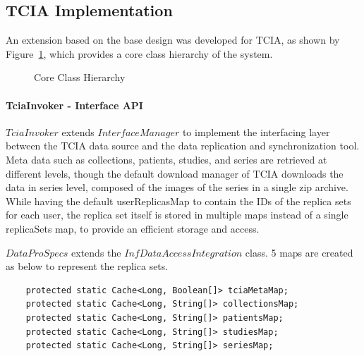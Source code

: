 \documentclass[conference]{IEEEtran}
\begin{document}
\subsection{TCIA Implementation}
An extension based on the base design was developed for TCIA, as shown by Figure~\ref{fig:class}, which provides a core class hierarchy of the system.
\begin{figure}[b]
\begin{center}
\end{center}
 \caption{Core Class Hierarchy}
 \label{fig:class}
\end{figure}

\paragraph*{TciaInvoker - Interface API}
$TciaInvoker$ extends $InterfaceManager$ to implement the interfacing layer between the TCIA data source and the data replication and synchronization tool. Meta data such as collections, patients, studies, and series are retrieved at different levels, though the default download manager of TCIA downloads the data in series level, composed of the images of the series in a single zip archive. While having the default userReplicasMap to contain the IDs of the replica sets for each user, the replica set itself is stored in multiple maps instead of a single replicaSets map, to provide an efficient storage and access.

$DataProSpecs$ extends the $InfDataAccessIntegration$ class. 5 maps are created as below to represent the replica sets.
\begin{lstlisting}  
    protected static Cache<Long, Boolean[]> tciaMetaMap;
    protected static Cache<Long, String[]> collectionsMap;
    protected static Cache<Long, String[]> patientsMap;
    protected static Cache<Long, String[]> studiesMap;
    protected static Cache<Long, String[]> seriesMap;
\end{lstlisting} 
\end{document}
